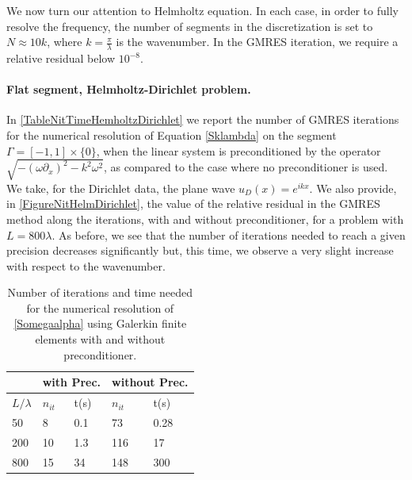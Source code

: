 \documentclass[a4paper]{article}
\begin{document}
\vspace*{0.5cm}

We now turn our attention to Helmholtz equation. In each case, in order to fully resolve the frequency, the number of segments in the 
discretization is set to $N \approx 10k$, where $k = \frac{\pi}{\lambda}$ is the wavenumber. In the GMRES iteration, we require a relative 
residual below $10^{-8}$. 

\paragraph{Flat segment, Helmholtz-Dirichlet problem.} 
In \autoref{TableNitTimeHemholtzDirichlet} we report the number of GMRES iterations for the numerical resolution of Equation \eqref{Sklambda} 
on the segment $\Gamma = [-1,1]\times \{0\}$, when the linear system is preconditioned by the operator $\sqrt{-(\omega \partial_x)^2 - k^2 \omega^2}$, as 
compared to the case where no preconditioner is used.  We take, for the Dirichlet data, the plane wave $u_D(x) = e^{ikx}$. We also provide, in 
\autoref{FigureNitHelmDirichlet}, the value of the relative residual in the GMRES method along the iterations, with and without preconditioner, 
for a problem with $L = 800 \lambda$. As before, we see that the number of iterations needed to reach a given precision decreases significantly but, this time, 
we observe a very slight increase with respect to the wavenumber. 
\begin{table}[H]
	\begin{center}
		\begin{tabular}{m{4em} | m{4em} | m{4em} | m{4em} | m{4em}} 
			\hline
			\multicolumn{1}{c|}{ }&
			\multicolumn{2}{c|}{with Prec.}&\multicolumn{2}{c}{without Prec.}\\
			\hline
			$L/\lambda$ & $n_{it}$& t(s) & $n_{it}$ & t(s)\\
			\hline\hline
			50 & 8 & 0.1 & 73 & 0.28\\
			\hline
			200 & 10 & 1.3 & 116 & 17\\
			\hline
			800 & 15 & 34 & 148 & 300\\
			\hline
		\end{tabular}
	\end{center}
	\caption{Number of iterations and time needed for the numerical resolution of \eqref{Somegaalpha} using Galerkin finite elements with and without preconditioner.}
	\label{TableNitTimeHemholtzDirichlet}
\end{table}
\end{document}
